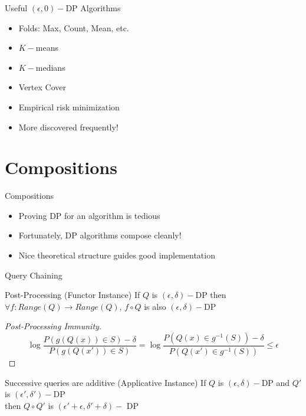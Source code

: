 \documentclass{beamer}
\newcommand{\epsdelt}{$(\epsilon,\delta)-$}
\begin{document}
\begin{frame}{Useful $(\epsilon,0)-$DP Algorithms}
  \begin{itemize}
    \item Folds: Max, Count, Mean, etc.
    \item $K-$means
    \item $K-$medians
    \item Vertex Cover
    \item Empirical risk minimization
    \item More discovered frequently!
  \end{itemize}
\end{frame}

\section{Compositions}
\begin{frame}{Compositions}
  \begin{itemize}
    \item Proving DP for an algorithm is tedious
    \pause
    \item Fortunately, DP algorithms compose cleanly!
    \item Nice theoretical structure guides good implementation
  \end{itemize}
\end{frame}
\begin{frame}{Query Chaining}
\begin{block}{Post-Processing (Functor Instance)}
  If $Q$ is \epsdelt DP then\\
  $\forall f : Range(Q) \to Range(Q)$, $f \circ Q$ is also \epsdelt DP
\end{block}

\begin{proof}[Post-Processing Immunity]
  \[\log{\frac{P(g(Q(x)) \in S) - \delta}{P(g(Q(x')) \in S)}} =
  \log{\frac{P(Q(x) \in g^{-1}(S)) - \delta}{P(Q(x') \in g^{-1}(S))}}
  \leq \epsilon \]
\end{proof}
\begin{block}{Successive queries are additive (Applicative Instance)}
If $Q$ is \epsdelt DP and $Q'$ is $(\epsilon',\delta')-$DP\\
then $Q \circ Q'$ is $(\epsilon' + \epsilon, \delta' + \delta)-$ DP
\end{block}
\end{frame}
\end{document}
